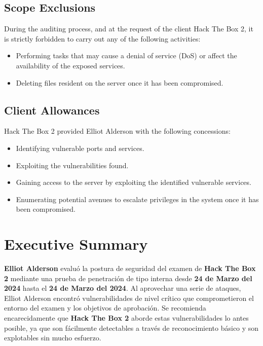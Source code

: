 \documentclass[a4paper]{article} %
\newcommand{\clientName}{Hack The Box 2}
\newcommand{\theAuthor}{Elliot Alderson}
\newcommand{\startDatePentest}{24 de Marzo del 2024}
\newcommand{\finalDatePentest}{24 de Marzo del 2024}
\begin{document}
    \subsection{Scope Exclusions}

    During the auditing process, and at the request of the client {\clientName}, it is strictly forbidden to carry out any of the following activities:
    
    \begin{itemize}
        \item Performing tasks that may cause a denial of service (DoS) or affect the availability of the exposed services.
        \item Deleting files resident on the server once it has been compromised.
    \end{itemize}
    
    \subsection{Client Allowances}
    {\clientName} provided {\theAuthor} with the following concessions:

    \begin{itemize}
        \item Identifying vulnerable ports and services.
        \item Exploiting the vulnerabilities found.
        \item Gaining access to the server by exploiting the identified vulnerable services.
        \item Enumerating potential avenues to escalate privileges in the system once it has been compromised.
    \end{itemize}

    \clearpage

    \section{Executive Summary}
    \textbf{\theAuthor} evaluó la postura de seguridad del examen de \textbf{\clientName} mediante una prueba de penetración de tipo interna desde \textbf{{\startDatePentest}} hasta el \textbf{{\finalDatePentest}}. Al aprovechar una serie de ataques, {\theAuthor} encontró vulnerabilidades de nivel crítico que comprometieron el entorno del examen y los objetivos de aprobación. Se recomienda encarecidamente que \textbf{\clientName} aborde estas vulnerabilidades lo antes posible, ya que son fácilmente detectables a través de reconocimiento básico y son explotables sin mucho esfuerzo.
\end{document}

